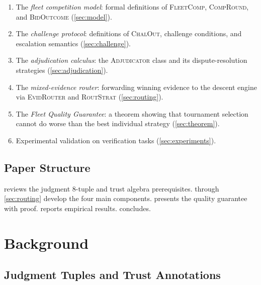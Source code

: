 \documentclass[11pt]{article}
\providecommand{\FleetComp}{\textsc{FleetComp}}   %
\providecommand{\CompRound}{\textsc{CompRound}}   %
\providecommand{\BidOut}{\textsc{BidOutcome}}     %
\providecommand{\ChalOut}{\textsc{ChalOut}}       %
\providecommand{\EvidRouter}{\textsc{EvidRouter}} %
\providecommand{\RoutStrat}{\textsc{RoutStrat}}   %
\begin{document}
\begin{enumerate}[label=(\roman*)]
  \item The \emph{fleet competition model}: formal definitions of
    \FleetComp{}, \CompRound{}, and \BidOut{} (\cref{sec:model}).

  \item The \emph{challenge protocol}: definitions of \ChalOut{},
    challenge conditions, and escalation semantics (\cref{sec:challenge}).

  \item The \emph{adjudication calculus}: the \textsc{Adjudicator} class
    and its dispute-resolution strategies (\cref{sec:adjudication}).

  \item The \emph{mixed-evidence router}: forwarding winning evidence to the
    descent engine via \EvidRouter{} and \RoutStrat{} (\cref{sec:routing}).

  \item The \emph{Fleet Quality Guarantee}: a theorem showing that
    tournament selection cannot do worse than the best individual strategy
    (\cref{sec:theorem}).

  \item Experimental validation on \numcases{} verification tasks
    (\cref{sec:experiments}).
\end{enumerate}

\subsection{Paper Structure}

 reviews the judgment 8-tuple and trust algebra
prerequisites.   through \cref{sec:routing} develop the four
main components.   presents the quality guarantee with proof.
 reports empirical results.  
concludes.

\section{Background}\label{sec:background}

\subsection{Judgment Tuples and Trust Annotations}
\end{document}
